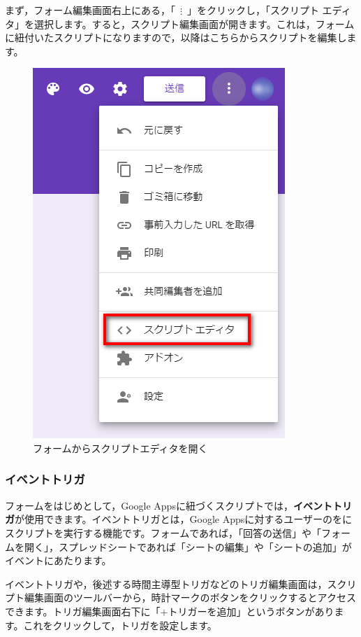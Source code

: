 \documentclass[uplatex,a4j]{jsarticle}
\begin{document}
まず，フォーム編集画面右上にある，「\ $\mathbf{\vdots}$\ 」をクリックし，「スクリプト エディタ」を選択します。すると，スクリプト編集画面が開きます。これは，フォームに紐付いたスクリプトになりますので，以降はこちらからスクリプトを編集します。

\begin{figure}[H]
 \centering
 \includegraphics[keepaspectratio, scale=0.5]{images/form_sample4.png}
 \caption{フォームからスクリプトエディタを開く}
 \label{fig:form_sample4}
\end{figure}

\subsubsection{イベントトリガ}
\label{ssub:event_trigger}

フォームをはじめとして，Google Appsに紐づくスクリプトでは，\textbf{イベントトリガ}が使用できます。イベントトリガとは，Google Appsに対するユーザーのをにスクリプトを実行する機能です。フォームであれば，「回答の送信」や「フォームを開く」，スプレッドシートであれば「シートの編集」や「シートの追加」がイベントにあたります。


イベントトリガや，後述する時間主導型トリガなどのトリガ編集画面は，スクリプト編集画面のツールバーから，時計マークのボタンをクリックするとアクセスできます。トリガ編集画面右下に「$+$トリガーを追加」というボタンがあります。これをクリックして，トリガを設定します。
\end{document}
